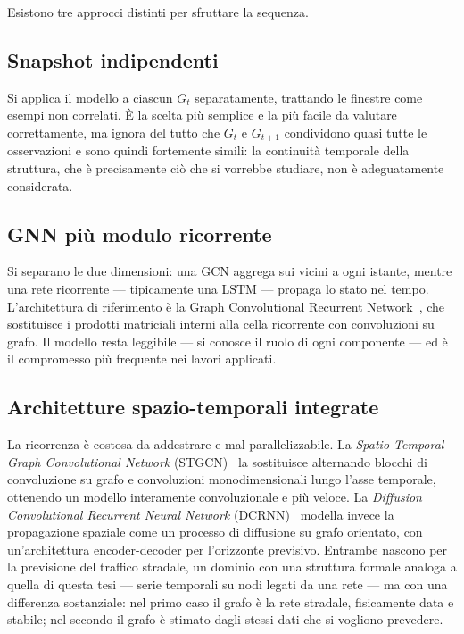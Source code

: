 Esistono tre approcci distinti per sfruttare la sequenza.

\subsection{Snapshot indipendenti}
Si applica il modello a ciascun $G_t$ separatamente, trattando le finestre come esempi non correlati. È la scelta più semplice e la più facile da valutare correttamente, ma ignora del tutto che $G_t$ e $G_{t+1}$ condividono quasi tutte le osservazioni e sono quindi fortemente simili: la continuità temporale della struttura, che è precisamente ciò che si vorrebbe studiare, non è adeguatamente considerata.

\subsection{GNN più modulo ricorrente}
Si separano le due dimensioni: una GCN aggrega sui vicini a ogni istante, mentre una rete ricorrente — tipicamente una LSTM — propaga lo stato nel tempo. L'architettura di riferimento è la Graph Convolutional Recurrent Network~\cite{seo2018gcrn}, che sostituisce i prodotti matriciali interni alla cella ricorrente con convoluzioni su grafo. Il modello resta leggibile — si conosce il ruolo di ogni componente — ed è il compromesso più frequente nei lavori applicati.

\subsection{Architetture spazio-temporali integrate}
La ricorrenza è costosa da addestrare e mal parallelizzabile. La \emph{Spatio-Temporal Graph Convolutional Network} (STGCN)~\cite{yu2018stgcn} la sostituisce alternando blocchi di convoluzione su grafo e convoluzioni monodimensionali lungo l'asse temporale, ottenendo un modello interamente convoluzionale e più veloce. La \emph{Diffusion Convolutional Recurrent Neural Network} (DCRNN)~\cite{li2018dcrnn} modella invece la propagazione spaziale come un processo di diffusione su grafo orientato, con un'architettura encoder-decoder per l'orizzonte previsivo. Entrambe nascono per la previsione del traffico stradale, un dominio con una struttura formale analoga a quella di questa tesi — serie temporali su nodi legati da una rete — ma con una differenza sostanziale: nel primo caso il grafo è la rete stradale, fisicamente data e stabile; nel secondo il grafo è stimato dagli stessi dati che si vogliono prevedere.

